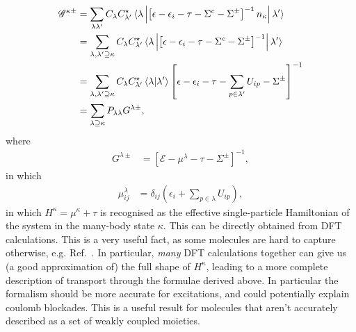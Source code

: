 \begin{align}
\mathscr{G}^{\kappa\pm} &= \sum_{\lambda\lambda'} C_\lambda C^\star_{\lambda'} \braket{\lambda \left| \left[ \epsilon - \epsilon_i - \tau - \Sigma^c - \Sigma^\pm\right]^{-1} n_\kappa \right| \lambda'} \nonumber \\
&= \sum_{\lambda,\lambda'\supseteq\kappa} C_\lambda C^\star_{\lambda'} \braket{\lambda \left| \left[ \epsilon - \epsilon_i - \tau - \Sigma^c - \Sigma^\pm\right]^{-1} \right| \lambda'} \nonumber \\
&= \sum_{\lambda,\lambda'\supseteq\kappa}  C_\lambda C^\star_{\lambda'} \braket{\lambda|\lambda'}  \left[ \epsilon - \epsilon_i - \tau - \sum_{p \in \lambda'} U_{ip} - \Sigma^\pm\right]^{-1}
\\&= \sum_{\lambda\supseteq\kappa} P_{\lambda\lambda} G^{\lambda\pm},\label{eq:mbgfresult}
\end{align}
where 
\begin{align*}
G^{\lambda\pm} &= \left[\mathscr{E} - \mu^\lambda - \tau - \Sigma^\pm \right]^{-1},
\end{align*}
in which
\begin{align}
\mu^\lambda_{ij} &= \delta_{ij} \left( \epsilon_i + \sum_{p\in\lambda} U_{ip} \right) \label{eq:result},
\end{align} in which $H^\kappa = \mu^\kappa + \tau$ is recognised as the effective single-particle Hamiltonian of the system in the many-body state $\kappa$. This can be directly obtained from DFT calculations. This is a very useful fact, as some molecules are hard to capture otherwise, e.g. Ref.~\cite{frisenda}. In particular, \emph{many} DFT calculations together can give us (a good approximation of) the full shape of $H^\kappa$, leading to a more complete description of transport through the formulae derived above. In particular the formalism should be more accurate for excitations, and could potentially explain coulomb blockades. This is a useful result for molecules that aren't accurately described as a set of weakly coupled moieties.


